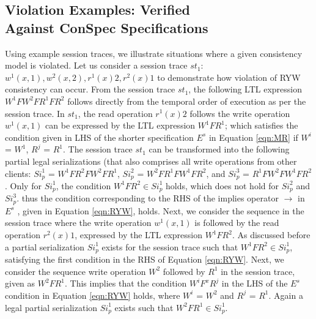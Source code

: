 \documentclass{sig-alternate-05-2015}
\begin{document}
\subsection{Violation Examples: Verified \\ Against ConSpec Specifications}
  Using example session traces, we illustrate situations where a given consistency model is violated. Let us consider a
session trace $\mathit{st}_1$: $w^1(x,1), w^2(x,2), r^1(x){2}, r^2(x){1}$ to demonstrate how violation of RYW consistency can occur.
 From the session trace $\mathit{st}_1$, the following LTL expression  \\ $W^1 F W^2 F R^1 F R^2$ follows
 directly from the temporal order of execution as per the session trace. In $\mathit{st}_1$, the read operation $r^1(x){2}$
 follows the write operation $w^1(x,1)$ can be expressed by the LTL expression $W^1 F R^1$; which satisfies the
 condition given in LHS of the shorter specification $E^{s}$ in Equation \ref{eqn:MR} if $W^i$ = $W^1$, $R^j$ = $R^1$. The session trace
 $\mathit{st}_1$ can be transformed into the following partial legal serializations (that also comprises all write operations from other
 clients: $\mathit{Si}_p^1$ = $W^1 F R^2 F W^2 F R^1$, $\mathit{Si}_p^2$ = $W^2 F R^1 F W^1 F R^2$,
  and $\mathit{Si}_p^3$ = $R^1 F W^2 F W^1 F R^2$.
 Only for $\mathit{Si}_p^1$, the condition $W^1 F R^2 \in \mathit{Si}_p^1$ holds, which does not hold for $\mathit{Si}_p^2$ and $\mathit{Si}_p^3$.
 thus the condition corresponding to the RHS of the implies operator $\rightarrow$ in $E^{s}$ , given in Equation \ref{eqn:RYW}, holds.
  Next, we consider the sequence in the session trace where the
   write operation $w^1(x,1)$ is followed by the read operation  $r^2(x){1}$, expressed by the LTL expression $W^1 F R^2$. As discussed before a partial
  serialization $\mathit{Si}_p^1$ exists for the session trace such that $W^1 F R^2 \in \mathit{Si}_p^1$, satisfying the first
  condition in the RHS of Equation \ref{eqn:RYW}.
  Next, we consider the sequence write operation $W^2$ followed by $R^1$ in the session trace, given as $W^2 F R^1$.
  This implies that the condition $W^i F^x R^j$ in the LHS of the $E^{s}$ condition in Equation \ref{eqn:RYW} holds, where $W^i$ = $W^2$ and
  $R^j$ = $R^1$. Again a legal partial serialization $\mathit{Si}_p^1$ exists such that $W^2 F R^1 \in \mathit{Si}_p^1$.
\end{document}
